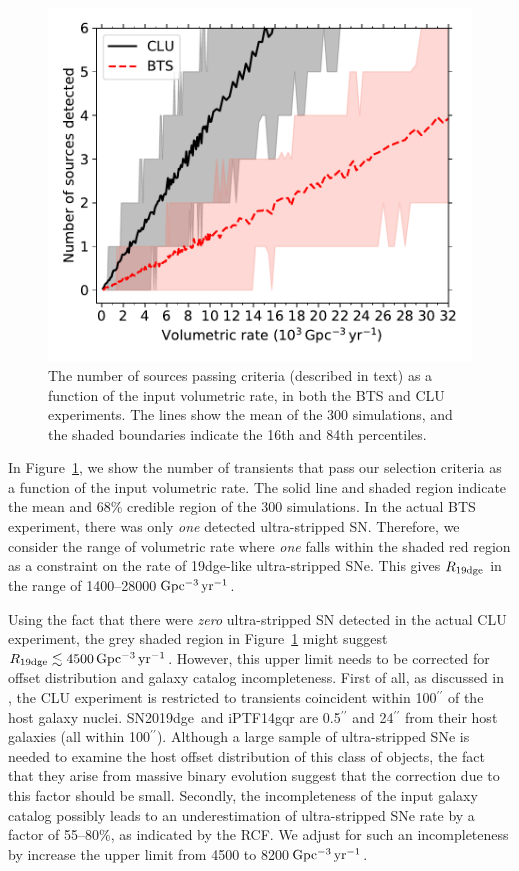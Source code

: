 \documentclass[twocolumn]{aastex63}
\newcommand{\name}{SN2019dge}
\begin{document}
\begin{figure}[htbp!]
	\centering
	\includegraphics[width=\columnwidth]{figures/SN2019dge_rate_pct.pdf}
	\caption{The number of sources passing criteria (described in text) as a 
		function of the input volumetric rate, in both the BTS and CLU experiments. The lines show the 
		mean of the 300 simulations, and the shaded boundaries indicate the 16th and 84th percentiles. 
		\label{fig:rate}}
\end{figure}

In Figure~\ref{fig:rate}, we show the number of transients that pass our selection criteria as a function 
of the input volumetric rate. The solid line and shaded region indicate the mean and 68\% credible 
region of the 300 simulations. In the actual BTS experiment, there was only \textit{one} detected 
ultra-stripped SN. Therefore, we consider the range of volumetric rate where \textit{one} falls within 
the shaded red region as a constraint on the rate of 19dge-like ultra-stripped SNe. 
This gives $R_{\rm 19dge}$ in the range of 1400--28000\,${\rm Gpc^{-3}\,yr^{-1}}$. 

Using the fact that there were \textit{zero} ultra-stripped SN detected in the actual CLU experiment, 
the 
grey shaded region in Figure~\ref{fig:rate} might suggest $R_{\rm 19dge}\lesssim 4500\,{\rm 
Gpc^{-3}\,yr^{-1}}$. However, this upper limit needs to be corrected for offset 
distribution and galaxy catalog incompleteness. First of all, as discussed in \citet{De2020b}, the CLU 
experiment is restricted to transients coincident within 100$^{\prime\prime}$ of the host galaxy nuclei. 
\name\ and iPTF14gqr are 0.5$^{\prime\prime}$ and 24$^{\prime\prime}$ from their host galaxies (all 
within 100$^{\prime\prime}$). Although a large sample of ultra-stripped SNe is needed to examine the 
host offset distribution of this class of objects, the fact that they arise from massive binary evolution 
suggest that the correction due to this factor should be small. Secondly, the incompleteness of the 
input galaxy catalog possibly leads to an underestimation of ultra-stripped SNe rate by a factor of 
55--80\%, as indicated by the RCF. We adjust for such an incompleteness by increase the upper limit 
from 4500 to 8200\,${\rm Gpc^{-3}\,yr^{-1}}$.
\end{document}
